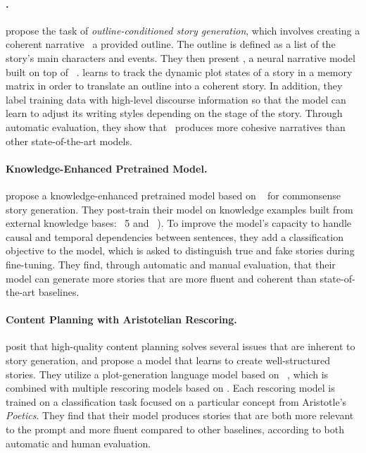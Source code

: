 \paragraph{\plotm.}
\citet{rashkin-etal-2020-plotmachines} propose the task of \emph{outline-conditioned story generation}, which involves creating a coherent narrative {\wrt}\ a provided outline. The outline is defined as a list of the story's main characters and events. They then present \plotm, a neural narrative model built on top of \gpt\ \citep{radford2018improving}. {\plotm} learns to track the dynamic plot states of a story in a memory matrix in order to translate an outline into a coherent story. In addition, they label training data with high-level discourse information so that the model can learn to adjust its writing styles depending on the stage of the story. Through automatic evaluation, they show that \plotm\ produces more cohesive narratives than other state-of-the-art models.

\paragraph{Knowledge-Enhanced Pretrained Model.}
\citet{guan-etal-2020-knowledge} propose a knowledge-enhanced pretrained model based on \gptt\ \citep{radford2019language} for commonsense story generation. They post-train their model on knowledge examples built from external knowledge bases: \cnet\ 5 \citep{speer2012representing} and \atomic\ \citep{sap2019atomic}). To improve the model's capacity to handle causal and temporal dependencies between sentences, they add a classification objective to the model, which is asked to distinguish true and fake stories during fine-tuning. They find, through automatic and manual evaluation, that their model can generate more stories that are more fluent and coherent than state-of-the-art baselines.

\paragraph{Content Planning with Aristotelian Rescoring.}
\citet{goldfarb-tarrant-etal-2020-content} posit that high-quality content planning solves several issues that are inherent to story generation, and propose a model that learns to create well-structured stories. They utilize a plot-generation language model based on \bart\ \citep{lewis2019bart}, which is combined with multiple rescoring models based on {\roberta}. Each rescoring model is trained on a classification task focused on a particular concept from Aristotle’s \emph{Poetics}. They find that their model produces stories that are both more relevant to the prompt and more fluent compared to other baselines, according to both automatic and human evaluation.

